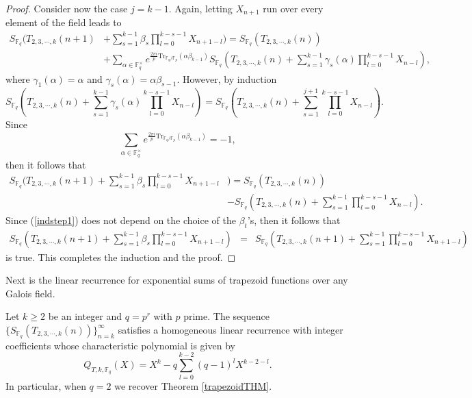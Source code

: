 \begin{proof}
Consider now the case $j=k-1$.  Again,  letting $X_{n+1}$ run over every element of the field leads to 
\begin{align}\nonumber
  S_{\mathbb{F}_q}(T_{2,3,\cdots,k}(n+1)&+\sum_{s=1}^{k-1}\beta_s\prod_{l=0}^{k-s-1}X_{n+1-l})= S_{\mathbb{F}_q}\left(T_{2,3,\cdots,k}(n)\right)\\
  &+\sum_{\alpha\in\mathbb{F}_q^{\times}} e^{\frac{2\pi i}{p} \text{Tr}_{\mathbb{F}_q/\mathbb{F}_p}(\alpha \beta_{k-1})} S_{\mathbb{F}_q}\left(T_{2,3,\cdots,k}(n)+\sum_{s=1}^{k-1}\gamma_s(\alpha)\prod_{l=0}^{k-s-1}X_{n-l}\right),
\end{align}
where $\gamma_1(\alpha)=\alpha$ and $\gamma_s(\alpha) = \alpha \beta_{s-1}$.  However, by induction
\begin{equation}
 S_{\mathbb{F}_q}\left(T_{2,3,\cdots,k}(n)+\sum_{s=1}^{k-1}\gamma_s(\alpha)\prod_{l=0}^{k-s-1}X_{n-l}\right)=S_{\mathbb{F}_q}\left(T_{2,3,\cdots,k}(n)+\sum_{s=1}^{j+1}\prod_{l=0}^{k-s-1}X_{n-l}\right).
\end{equation}
Since
\begin{equation}
 \sum_{\alpha \in \mathbb{F}_q^\times}e^{\frac{2\pi i}{p} \text{Tr}_{\mathbb{F}_q/\mathbb{F}_p}(\alpha \beta_{k-1})}=-1,
\end{equation}
then it follows that
\begin{align}\nonumber
\label{indstep2}
  S_{\mathbb{F}_q}(T_{2,3,\cdots,k}(n+1)+\sum_{s=1}^{k-1}\beta_s\prod_{l=0}^{k-s-1}X_{n+1-l}&)= S_{\mathbb{F}_q}\left(T_{2,3,\cdots,k}(n)\right)\\
  &- S_{\mathbb{F}_q}\left(T_{2,3,\cdots,k}(n)+\sum_{s=1}^{k-1}\prod_{l=0}^{k-s-1}X_{n-l}\right).
\end{align}
Since (\ref{indstep1}) does not depend on the choice of the $\beta_t$'s, then it follows that
\begin{eqnarray}\nonumber
  S_{\mathbb{F}_q}\left(T_{2,3,\cdots,k}(n+1)+\sum_{s=1}^{k-1}\beta_s\prod_{l=0}^{k-s-1}X_{n+1-l}\right)&=& S_{\mathbb{F}_q}\left(T_{2,3,\cdots,k}(n+1)+\sum_{s=1}^{k-1}\prod_{l=0}^{k-s-1}X_{n+1-l}\right)
\end{eqnarray}
is true.  This completes the induction and the proof.
\end{proof}

Next is the linear recurrence for exponential sums of trapezoid functions over any Galois field.

\begin{theorem}
\label{thmtrapgen}
Let $k\geq 2$ be an integer and $q=p^r$ with $p$ prime. The sequence $\{S_{\mathbb{F}_q}(T_{2,3,\cdots,k}(n))\}_{n=k}^\infty$ satisfies a homogeneous linear recurrence with integer coefficients whose characteristic polynomial is given by 
 \begin{equation}
 \label{charpolygeneral}
  Q_{T,k,\mathbb{F}_q}(X)=X^k-q \sum _{l=0}^{k-2} (q-1)^l X^{k-2-l}.
 \end{equation}
 In particular, when $q=2$ we recover Theorem \ref{trapezoidTHM}.
\end{theorem}

